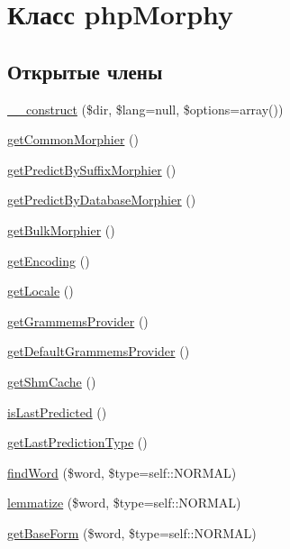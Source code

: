 \hypertarget{classphpMorphy}{
\section{Класс phpMorphy}
\label{classphpMorphy}
}
\subsection*{Открытые члены}
\begin{DoxyCompactItemize}
\item 
\hyperlink{classphpMorphy_abbc827157f80407ebaacbfbabafea5b9}{\_\-\_\-construct} (\$dir, \$lang=null, \$options=array())
\item 
\hyperlink{classphpMorphy_ac204e610811ccb56dc8ac3b15836352c}{getCommonMorphier} ()
\item 
\hyperlink{classphpMorphy_a2b9f94dc327e179c72301a20e5f8198b}{getPredictBySuffixMorphier} ()
\item 
\hyperlink{classphpMorphy_aefd19f95880f79f7f42a7ab2805aa188}{getPredictByDatabaseMorphier} ()
\item 
\hyperlink{classphpMorphy_a75415fda8b50defd5b448197e2531c06}{getBulkMorphier} ()
\item 
\hyperlink{classphpMorphy_a25acea38c2d40849d3b4e98c41eea443}{getEncoding} ()
\item 
\hyperlink{classphpMorphy_a7c522cd19ec8d9d537a56719d9e83780}{getLocale} ()
\item 
\hyperlink{classphpMorphy_a03ad597a07619294a843a7d3e1c7f66b}{getGrammemsProvider} ()
\item 
\hyperlink{classphpMorphy_abbafbd0a020b3d8ff51e1c6e25667a5e}{getDefaultGrammemsProvider} ()
\item 
\hyperlink{classphpMorphy_a2ca6ddade65efffb106f2156c67bb66b}{getShmCache} ()
\item 
\hyperlink{classphpMorphy_af19e83bcc40a6f547b60bc9c46be05eb}{isLastPredicted} ()
\item 
\hyperlink{classphpMorphy_a92b63c211019dca58e8e6d6de004756b}{getLastPredictionType} ()
\item 
\hyperlink{classphpMorphy_a5f45142b748c649cb29fc8e117e759e6}{findWord} (\$word, \$type=self::NORMAL)
\item 
\hyperlink{classphpMorphy_aefeaecaf9831657a570a28d8529be006}{lemmatize} (\$word, \$type=self::NORMAL)
\item 
\hyperlink{classphpMorphy_a7a4e83b1017ee422e96429a1bd6fd8f7}{getBaseForm} (\$word, \$type=self::NORMAL)
\item 

\end{DoxyCompactItemize}
